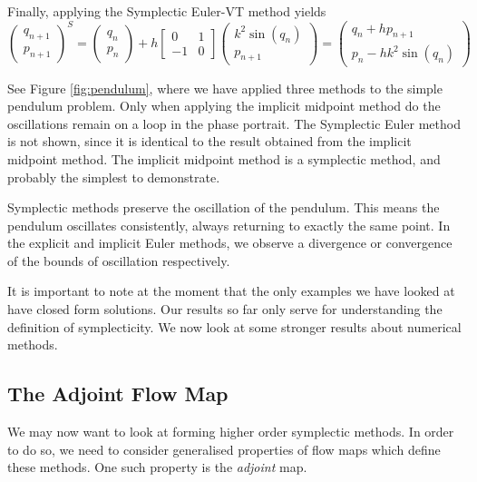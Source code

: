Finally, applying the Symplectic Euler-VT method yields
\begin{equation}
	\begin{pmatrix}
		q_{n+1} \\
		p_{n+1}
	\end{pmatrix}^S = \begin{pmatrix}
		q_n \\
		p_n
	\end{pmatrix} + h \begin{bmatrix}
		0 & 1 \\
		-1 & 0
	\end{bmatrix} \begin{pmatrix}
		k^2 \sin(q_n) \\
		p_{n+1}
	\end{pmatrix} = \begin{pmatrix}
		q_n + h p_{n+1} \\
		p_n - h k^2 \sin(q_n)
	\end{pmatrix}
\end{equation}

See Figure \ref{fig:pendulum}, where we have applied three methods to the simple pendulum problem.
Only when applying the implicit midpoint method do the oscillations remain on a loop in the phase portrait.
The Symplectic Euler method is not shown, since it is identical to the result obtained from the implicit midpoint method.
The implicit midpoint method is a symplectic method, and probably the simplest to demonstrate.

Symplectic methods preserve the oscillation of the pendulum.
This means the pendulum oscillates consistently, always returning to exactly the same point.
In the explicit and implicit Euler methods, we observe a divergence or convergence of the bounds of oscillation respectively.

It is important to note at the moment that the only examples we have looked at have closed form solutions.
Our results so far only serve for understanding the definition of symplecticity.
We now look at some stronger results about numerical methods.

\subsection{The Adjoint Flow Map}

We may now want to look at forming higher order symplectic methods. In order to do so, we need to consider generalised properties of flow maps which define these methods.
One such property is the \textit{adjoint} map.

